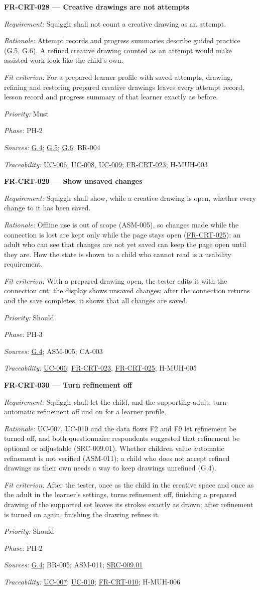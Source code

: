 \documentclass[12pt]{article}
\renewcommand{\_}{\textunderscore\allowbreak}%
\newcommand{\goalref}[1]{\hyperref[goal:#1]{G.#1}}
\newcommand{\ucref}[1]{\hyperref[uc:#1]{\mbox{UC-#1}}}
\newenvironment{srsrequirement}[2]{%
  \par\medskip\noindent\phantomsection\label{req:#1}%
  \textbf{#1 --- #2}\par\nobreak\smallskip }{\par\medskip}
\newcommand{\reqfield}[2]{\noindent\textit{#1:} #2\par}
\newcommand{\reqshall}[1]{\reqfield{Requirement}{#1}}
\newcommand{\reqrationale}[1]{\reqfield{Rationale}{#1}}
\newcommand{\reqfit}[1]{\reqfield{Fit criterion}{#1}}
\newcommand{\reqpriority}[1]{\reqfield{Priority}{#1}}
\newcommand{\reqphase}[1]{\reqfield{Phase}{#1}}
\newcommand{\reqsources}[1]{\reqfield{Sources}{#1}}
\newcommand{\reqtraces}[1]{\reqfield{Traceability}{#1}}
\newcommand{\reqref}[1]{\hyperref[req:#1]{#1}}
\providecommand{\ucref}[1]{\hyperref[uc:#1]{UC-#1}}
\begin{document}
\begin{srsrequirement}{FR-CRT-028}{Creative drawings are not attempts}
  \reqshall{Squigglr shall not count a creative drawing as an attempt.}
  \reqrationale{Attempt records and progress summaries describe guided practice
(G.5, G.6). A refined creative drawing counted as an attempt would make assisted
work look like the child's own.} \reqfit{For a prepared learner profile with
saved attempts, drawing, refining and restoring prepared creative drawings
leaves every attempt record, lesson record and progress summary of that learner
exactly as before.}
  \reqpriority{Must}
  \reqphase{PH-2}
  \reqsources{\goalref{4}; \goalref{5}; \goalref{6}; BR-004}
  \reqtraces{\ucref{006}, \ucref{008}, \ucref{009}; \reqref{FR-CRT-023};
  H-MUH-003}
\end{srsrequirement}

\begin{srsrequirement}{FR-CRT-029}{Show unsaved changes}
  \reqshall{Squigglr shall show, while a creative drawing is open, whether every
change to it has been saved.} \reqrationale{Offline use is out of scope
(ASM-005), so changes made while the connection is lost are kept only while the
page stays open (\reqref{FR-CRT-025}); an adult who can see that changes are not
yet saved can keep the page open until they are. How the state is shown to a
child who cannot read is a usability requirement.} \reqfit{With a prepared
drawing open, the tester edits it with the connection cut; the display shows
unsaved changes; after the connection returns and the save completes, it shows
that all changes are saved.}
  \reqpriority{Should}
  \reqphase{PH-3}
  \reqsources{\goalref{4}; ASM-005; CA-003} \reqtraces{\ucref{006};
  \reqref{FR-CRT-023}, \reqref{FR-CRT-025}; H-MUH-005}
\end{srsrequirement}

\begin{srsrequirement}{FR-CRT-030}{Turn refinement off}
  \reqshall{Squigglr shall let the child, and the supporting adult, turn
automatic refinement off and on for a learner profile.} \reqrationale{UC-007,
UC-010 and the data flows F2 and F9 let refinement be turned off, and both
questionnaire respondents suggested that refinement be optional or adjustable
(SRC-009.01). Whether children value automatic refinement is not verified
(ASM-011); a child who does not accept refined drawings as their own needs a way
to keep drawings unrefined (G.4).} \reqfit{After the tester, once as the child
in the creative space and once as the adult in the learner's settings, turns
refinement off, finishing a prepared drawing of the supported set leaves its
strokes exactly as drawn; after refinement is turned on again, finishing the
drawing refines it.}
  \reqpriority{Should}
  \reqphase{PH-2}
  \reqsources{\goalref{4}; BR-005; ASM-011; \hyperref[src:009.01]{SRC-009.01}}
  \reqtraces{\ucref{007}; \ucref{010}; \reqref{FR-CRT-010}; H-MUH-006}
\end{srsrequirement}
\end{document}
